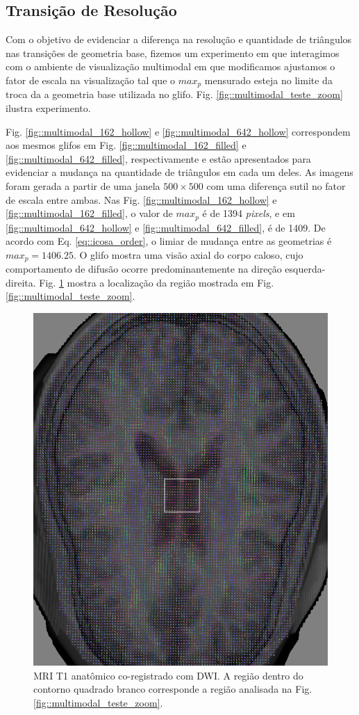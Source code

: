 \documentclass[
    12pt,                %
    oneside,            %
    a4paper,            %
    english,            %
    french,                %
    spanish,            %
    brazil                %
    ]{abntex2}
\begin{document}
\subsection{Transição de Resolução}

Com o objetivo de evidenciar a diferença na resolução e quantidade de triângulos nas transições de geometria base, fizemos um experimento em que interagimos com o ambiente de visualização multimodal em que modificamos ajustamos o fator de escala na visualização tal que o $max_p$ mensurado esteja no limite da troca da a geometria base utilizada no glifo. Fig.  \ref{fig::multimodal_teste_zoom} ilustra experimento.

Fig. \ref{fig::multimodal_162_hollow} e \ref{fig::multimodal_642_hollow} correspondem aos mesmos glifos em Fig. \ref{fig::multimodal_162_filled} e \ref{fig::multimodal_642_filled}, respectivamente e estão apresentados para evidenciar a mudança na quantidade de triângulos em cada um deles. As imagens foram gerada a partir de uma janela $500 \times 500$ com uma diferença sutil no fator de escala entre ambas. Nas Fig. \ref{fig::multimodal_162_hollow} e \ref{fig::multimodal_162_filled}, o valor de $max_p$ é de 1394 \textit{pixels}, e em \ref{fig::multimodal_642_hollow} e \ref{fig::multimodal_642_filled}, é de 1409. De acordo com Eq. \ref{eq::icosa_order}, o limiar de mudança entre as geometrias é $max_p = 1406.25$.  O glifo mostra uma visão axial do corpo caloso, cujo comportamento de difusão ocorre predominantemente na direção esquerda-direita. Fig. \ref{fig::multimodal_teste_loc} mostra a localização da região mostrada em Fig. \ref{fig::multimodal_teste_zoom}.


\begin{figure}[ht]
    \centering
    \includegraphics[width=.56\linewidth, angle=0]{figs/Esquema_Glifo/Teste_transicao/base_teste_zoom.png}
    \caption{MRI T1 anatômico co-registrado com DWI. A região dentro do contorno quadrado branco corresponde a região analisada na Fig. \ref{fig::multimodal_teste_zoom}.}
    \label{fig::multimodal_teste_loc}
\end{figure}
\end{document}
